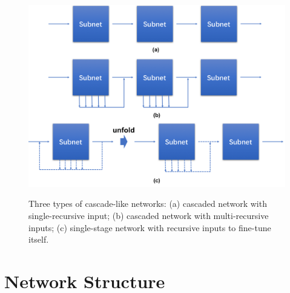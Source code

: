 \documentclass[senior]{IPSstyle}
\begin{document}
\begin{figure}[t]
  \centering
  \includegraphics[width=15cm]{cascade_structures.png}\\
  \caption{Three types of cascade-like networks: (a) cascaded network with single-recursive input; (b) cascaded network with multi-recursive inputs; (c) single-stage network with recursive inputs to fine-tune itself.}\label{cascade_structures}
\end{figure}

\section{Network Structure} \label{network structure}
\end{document}
